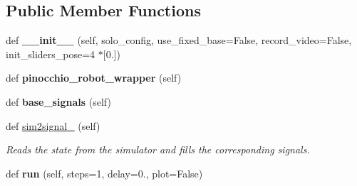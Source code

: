 \subsection*{Public Member Functions}
\begin{DoxyCompactItemize}
\item 
def {\bfseries \+\_\+\+\_\+init\+\_\+\+\_\+} (self, solo\+\_\+config, use\+\_\+fixed\+\_\+base=False, record\+\_\+video=False, init\+\_\+sliders\+\_\+pose=4 $\ast$\mbox{[}0.\mbox{]})\hypertarget{classdg__blmc__robots_1_1solo_1_1solo__base__bullet_1_1SoloBaseRobot_a30831d3a65a139e6bfc5328d214fcd9a}{}\label{classdg__blmc__robots_1_1solo_1_1solo__base__bullet_1_1SoloBaseRobot_a30831d3a65a139e6bfc5328d214fcd9a}

\item 
def {\bfseries pinocchio\+\_\+robot\+\_\+wrapper} (self)\hypertarget{classdg__blmc__robots_1_1solo_1_1solo__base__bullet_1_1SoloBaseRobot_ac0cbf1db601813d147e29d17533ced49}{}\label{classdg__blmc__robots_1_1solo_1_1solo__base__bullet_1_1SoloBaseRobot_ac0cbf1db601813d147e29d17533ced49}

\item 
def {\bfseries base\+\_\+signals} (self)\hypertarget{classdg__blmc__robots_1_1solo_1_1solo__base__bullet_1_1SoloBaseRobot_abdb28c7e04b4a10bdb8d7fd2145337eb}{}\label{classdg__blmc__robots_1_1solo_1_1solo__base__bullet_1_1SoloBaseRobot_abdb28c7e04b4a10bdb8d7fd2145337eb}

\item 
def \hyperlink{classdg__blmc__robots_1_1solo_1_1solo__base__bullet_1_1SoloBaseRobot_aec775b51651007698dde474e4ff5a573}{sim2signal\+\_\+} (self)
\begin{DoxyCompactList}\small\item\em Reads the state from the simulator and fills the corresponding signals. \end{DoxyCompactList}\item 
def {\bfseries run} (self, steps=1, delay=0., plot=False)\hypertarget{classdg__blmc__robots_1_1solo_1_1solo__base__bullet_1_1SoloBaseRobot_a18e7c652d6afa110ce4bd20c655de551}{}\label{classdg__blmc__robots_1_1solo_1_1solo__base__bullet_1_1SoloBaseRobot_a18e7c652d6afa110ce4bd20c655de551}


\end{DoxyCompactItemize}
